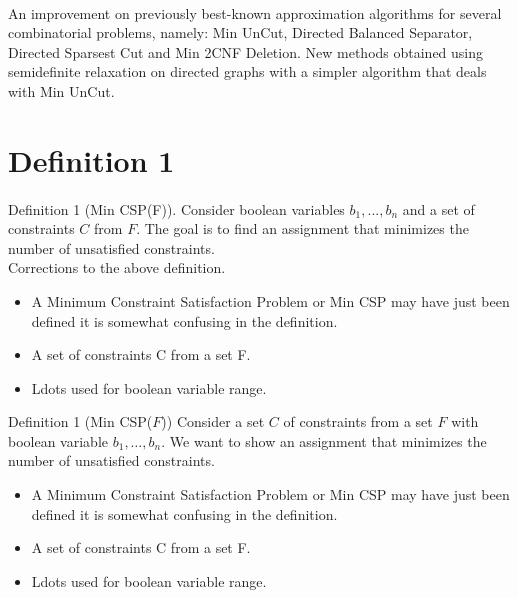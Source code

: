 \documentclass[11pt]{article}
\begin{document}
\paragraph{} 
    {\color{blue}
    An improvement on previously best-known approximation algorithms for several 
    combinatorial problems, namely: Min UnCut, Directed Balanced Separator, 
    Directed Sparsest Cut and Min 2CNF Deletion. New methods obtained using 
    semidefinite relaxation on directed graphs with a simpler algorithm that 
    deals with Min UnCut.} \\

\section{Definition 1}

\paragraph{}
    Definition 1 (Min {\color{red}CSP(F)}). Consider boolean 
    variables {\color{red}$b_1,...,b_n$} and a set of constraints 
    {\color{red}$C$ from $F$}. The goal is to find an assignment 
    that minimizes the number of unsatisfied constraints. \\

    Corrections to the above definition.

    \begin{itemize}
        \item A Minimum Constraint Satisfaction Problem or Min CSP may have just been 
    defined it is somewhat confusing in the definition. 
        \item A set of constraints C from a set F.
        \item Ldots used for boolean variable range.
    \end{itemize}


    Definition 1 (Min CSP($F$)) Consider {\color{blue}a set $C$ of constraints from a 
    set $F$} with boolean variable {\color{blue}$b_1, \ldots, b_n$}. 
    {\color{blue}We want to show} an assignment that minimizes the number of 
    unsatisfied constraints.

    \begin{itemize}
        \item A Minimum Constraint Satisfaction Problem or Min CSP may have just been 
    defined it is somewhat confusing in the definition. 
        \item A set of constraints C from a set F.
        \item Ldots used for boolean variable range.
    \end{itemize}
\end{document}
